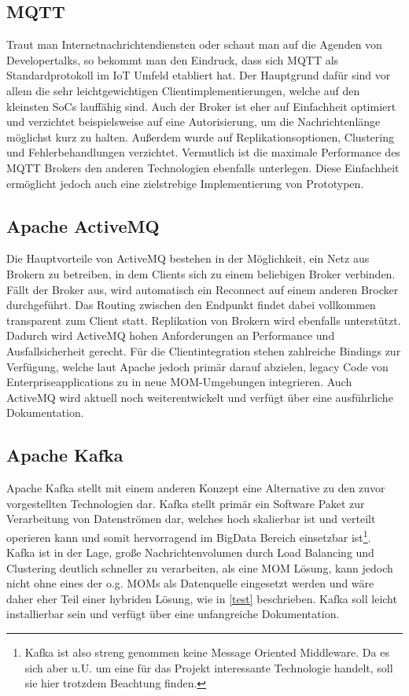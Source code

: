 \documentclass[conference, ngerman]{IEEEtran}
\begin{document}
\subsection{MQTT}
Traut man Internetnachrichtendiensten oder schaut man auf die Agenden von Developertalks, so bekommt man den Eindruck, dass sich MQTT als Standardprotokoll im IoT Umfeld etabliert hat\cite{UNDERPROT}\cite{FIVETHINGS}. Der Hauptgrund dafür sind vor allem die sehr leichtgewichtigen Clientimplementierungen, welche auf den kleinsten SoCs lauffähig sind.\cite{wiki:MQTT} Auch der Broker ist eher auf Einfachheit optimiert und verzichtet beispielsweise auf eine Autorisierung, um die Nachrichtenlänge möglichst kurz zu halten\cite{MQTTSEC}. Außerdem wurde auf Replikationsoptionen, Clustering und Fehlerbehandlungen verzichtet. Vermutlich ist die maximale Performance des MQTT Brokers den anderen Technologien ebenfalls unterlegen. Diese Einfachheit ermöglicht jedoch auch eine zielstrebige Implementierung von Prototypen\cite{KOMQTT}\cite{KOMAPPIN}. 

\subsection{Apache ActiveMQ}
Die Hauptvorteile von ActiveMQ bestehen in der Möglichkeit, ein Netz aus Brokern zu betreiben, in dem Clients sich zu einem beliebigen Broker verbinden. Fällt der Broker aus, wird automatisch ein Reconnect auf einem anderen Brocker durchgeführt. Das Routing zwischen den Endpunkt findet dabei vollkommen transparent zum Client statt. Replikation von Brokern wird ebenfalls unterstützt. Dadurch wird ActiveMQ hohen Anforderungen an Performance und Ausfallsicherheit gerecht. Für die Clientintegration stehen zahlreiche Bindings zur Verfügung, welche laut Apache jedoch primär darauf abzielen, legacy Code von Enterpriseapplications zu in neue MOM-Umgebungen integrieren. Auch ActiveMQ wird aktuell noch weiterentwickelt und verfügt über eine ausführliche Dokumentation.\cite{wiki:AAMQ}

\subsection{Apache Kafka}
Apache Kafka stellt mit einem anderen Konzept eine Alternative zu den zuvor vorgestellten Technologien dar. Kafka stellt primär ein Software Paket zur Verarbeitung von Datenströmen dar, welches hoch skalierbar ist und verteilt operieren kann und somit hervorragend im BigData Bereich einsetzbar ist\cite{wiki:AKAFKA}\footnote{Kafka ist also streng genommen keine Message Oriented Middleware. Da es sich aber u.U. um eine für das Projekt interessante Technologie handelt, soll sie hier trotzdem Beachtung finden.}. Kafka ist in der Lage, große Nachrichtenvolumen durch Load Balancing und Clustering deutlich schneller zu verarbeiten, als eine MOM Lösung, kann jedoch nicht ohne eines der o.g. MOMs als Datenquelle eingesetzt werden und wäre daher eher Teil einer hybriden Lösung, wie in \ref{test} beschrieben. Kafka soll leicht installierbar sein und verfügt über eine unfangreiche Dokumentation\cite{AKW}. 
\end{document}
